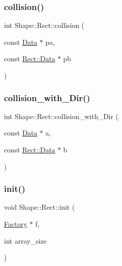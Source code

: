\subsubsection{\texorpdfstring{collision()}{collision()}}
{\footnotesize\ttfamily int Shape\+::\+Rect\+::collision (\begin{DoxyParamCaption}\item[{const \mbox{\hyperlink{struct_shape_1_1_rect_1_1_data}{Data}} $\ast$}]{pa,  }\item[{const \mbox{\hyperlink{struct_shape_1_1_rect_1_1_data}{Rect\+::\+Data}} $\ast$}]{pb }\end{DoxyParamCaption})}

\mbox{\label{namespace_shape_1_1_rect_accfbe0e95cb57179dea7daa7a0fd79f8}} 
\subsubsection{\texorpdfstring{collision\+\_\+with\+\_\+\+Dir()}{collision\_with\_Dir()}}
{\footnotesize\ttfamily int Shape\+::\+Rect\+::collision\+\_\+with\+\_\+\+Dir (\begin{DoxyParamCaption}\item[{const \mbox{\hyperlink{struct_shape_1_1_rect_1_1_data}{Data}} $\ast$}]{a,  }\item[{const \mbox{\hyperlink{struct_shape_1_1_rect_1_1_data}{Rect\+::\+Data}} $\ast$}]{b }\end{DoxyParamCaption})}

\mbox{\label{namespace_shape_1_1_rect_a2afc04d1f1a291cb1a08b1b1770dc116}} 
\subsubsection{\texorpdfstring{init()}{init()}}
{\footnotesize\ttfamily void Shape\+::\+Rect\+::init (\begin{DoxyParamCaption}\item[{\mbox{\hyperlink{struct_shape_1_1_rect_1_1_factory}{Factory}} $\ast$}]{f,  }\item[{int}]{array\+\_\+size }\end{DoxyParamCaption})}

